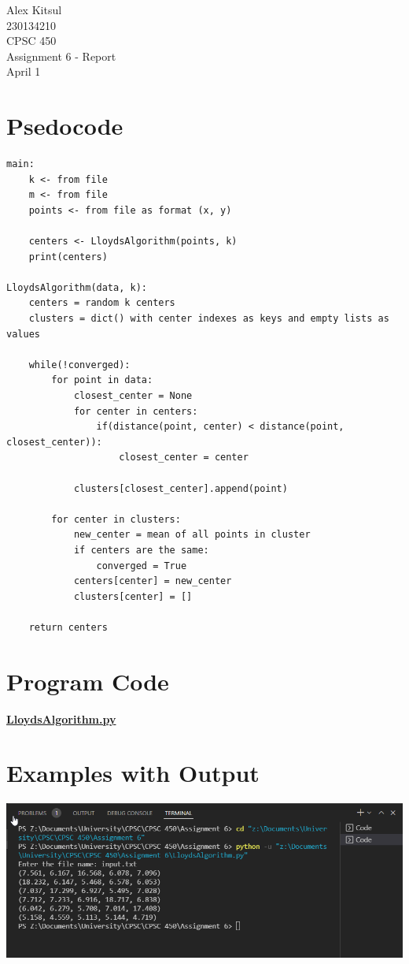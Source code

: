 \documentclass{article}
\begin{document}
\thispagestyle{empty}
\begin{center}
\vspace*{\fill}
\Huge Alex Kitsul\\
\Huge 230134210\\
\Huge CPSC 450\\
\Huge Assignment 6 - Report\\
\Huge April 1\\
\vspace*{\fill}
\end{center}
\pagebreak

\section*{Psedocode}
\begin{lstlisting}
main:
    k <- from file
    m <- from file
    points <- from file as format (x, y)

    centers <- LloydsAlgorithm(points, k)
    print(centers)
	
LloydsAlgorithm(data, k):
    centers = random k centers
    clusters = dict() with center indexes as keys and empty lists as values

    while(!converged):
        for point in data:
            closest_center = None
            for center in centers:
                if(distance(point, center) < distance(point, closest_center)):
                    closest_center = center

            clusters[closest_center].append(point)

        for center in clusters:
            new_center = mean of all points in cluster
            if centers are the same:
                converged = True
            centers[center] = new_center
            clusters[center] = []

    return centers
\end{lstlisting}

\pagebreak

\section*{Program Code}
\textbf{\underline{LloydsAlgorithm.py}}


\pagebreak

\section*{Examples with Output}
\includegraphics[scale=0.55]{input.png}\\
\end{document}
